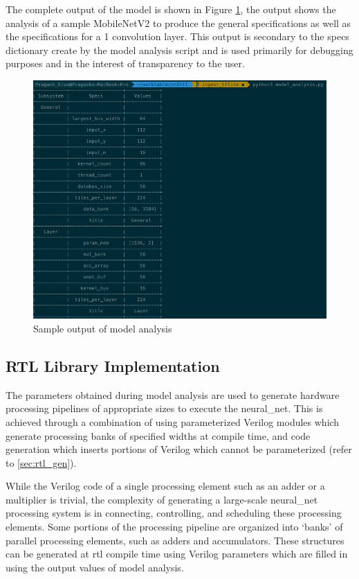 \documentclass{uw-ece-wkrpt}
\begin{document}
The complete output of the model is shown in Figure \ref{fig:model_analysis_output}, the output shows the analysis of a sample MobileNetV2 to produce the general specifications as well as the specifications for a 1  convolution layer. This output is secondary to the specs dictionary create by the model analysis script and is used primarily for debugging purposes and in the interest of transparency to the user.

\begin{figure}
\centering
\includegraphics[width=\textwidth]{figures/model_analysis_output}
\caption{Sample output of model analysis}\label{fig:model_analysis_output}
\end{figure}

\subsection{RTL Library Implementation}

The parameters obtained during model analysis are used to generate hardware processing pipelines of appropriate sizes to execute the \gls{neural_net}. This is achieved through a combination of using parameterized Verilog modules which generate processing banks of specified widths at compile time, and code generation which inserts portions of Verilog which cannot be parameterized (refer to \ref{sec:rtl_gen}).

While the Verilog code of a single processing element such as an adder or a multiplier is trivial, the complexity of generating a large-scale \gls{neural_net} processing system is in connecting, controlling, and scheduling these processing elements. Some portions of the processing pipeline are organized into `banks' of parallel processing elements, such as adders and accumulators. These structures can be generated at \gls{rtl} compile time using Verilog parameters which are filled in using the output values of model analysis.
\end{document}
